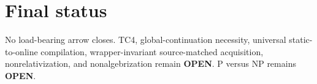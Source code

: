 \documentclass[11pt]{article}
\begin{document}
\section*{Final status}
No load-bearing arrow closes. TC4, global-continuation necessity, universal static-to-online compilation, wrapper-invariant source-matched acquisition, nonrelativization, and nonalgebrization remain \textbf{OPEN}. P versus NP remains \textbf{OPEN}.

\end{document}
